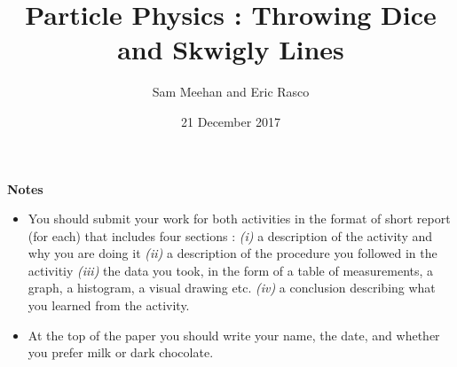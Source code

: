 \documentclass[12pt]{article}
\title{Particle Physics : Throwing Dice and Skwigly Lines}
\author{Sam Meehan and Eric Rasco}
\date{21 December 2017}
\begin{document}
\maketitle

\textbf{Notes}
\begin{itemize}
\item You should submit your work for both activities in the format of short report (for each) that includes four sections : \textit{(i)} a description of the activity and why you are doing it \textit{(ii)} a description of the procedure you followed in the activitiy \textit{(iii)} the data you took, in the form of a table of measurements, a graph, a histogram, a visual drawing etc. \textit{(iv)} a conclusion describing what you learned from the activity.
\item At the top of the paper you should write your name, the date, and whether you prefer milk or dark chocolate. 
\end{itemize}
\end{document}

